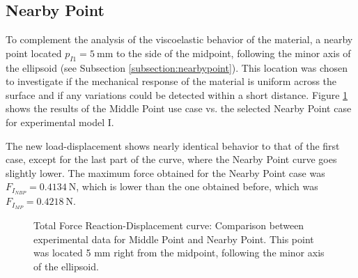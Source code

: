 

\subsection{Nearby Point}
\label{subsection:nearbypointresult}
To complement the analysis of the viscoelastic behavior of the material,
a nearby point located $p_{I1} = \SI{5}{\milli \m}$ to the side of the midpoint,
following the minor axis of the ellipsoid (see Subsection \ref{subsection:nearbypoint}). 
This location was chosen to investigate if the mechanical response of the material 
is uniform across the surface and if any variations could be detected within 
a short distance. Figure \ref{fig:midpointIvsnbpointI} shows the results of the 
Middle Point use case vs. the selected Nearby Point case for experimental model I. 

The new load-displacement shows nearly identical behavior to that of the 
first case, except for the last part of the curve, where the Nearby Point curve goes 
slightly lower. The maximum force obtained for the Nearby Point case was $F_{I_{NBP}} = \SI{0.4134}{\newton}$, 
which is lower than the one obtained before, which was $F_{I_{MP}} = \SI{0.4218}{\newton}$.\\

\begin{figure}%
    \centering
   \quad
   \caption{Total Force Reaction-Displacement curve: Comparison between experimental data for Middle Point and Nearby Point. This point was located 5 mm right from the midpoint, following the minor axis of the ellipsoid.}%
   \label{fig:midpointIvsnbpointI}%
\end{figure}

